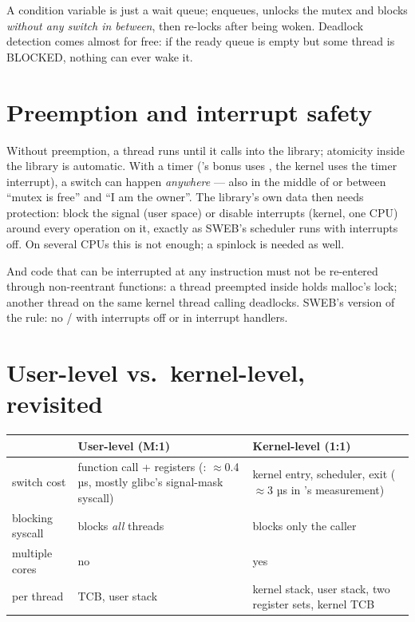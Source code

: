 A condition variable is just a wait queue;  enqueues,
unlocks the mutex and blocks \emph{without any switch in between},
then re-locks after being woken. Deadlock detection comes almost for free:
if the ready queue is empty but some thread is BLOCKED, nothing can ever
wake it.

\section{Preemption and interrupt safety}

Without preemption, a thread runs until it calls into the library;
atomicity inside the library is automatic. With a timer
('s bonus uses , the kernel uses the timer
interrupt), a switch can happen \emph{anywhere} --- also in the middle of
 or between ``mutex is free'' and ``I am the owner''. The
library's own data then needs protection: block the signal (user space)
or disable interrupts (kernel, one CPU) around every operation on it,
exactly as SWEB's scheduler runs with interrupts off. On several CPUs this
is not enough; a spinlock is needed as well.

And code that can be interrupted at any instruction must not be
re-entered through non-reentrant functions: a thread preempted inside
 holds malloc's lock; another thread on the same kernel
thread calling  deadlocks. SWEB's version of the rule: no
/ with interrupts off or in interrupt handlers.

\section{User-level vs.\ kernel-level, revisited}

\begin{center}
\begin{tabular}{L{3.6cm}L{4.8cm}L{4.8cm}}
\toprule
 & \textbf{User-level (M:1)} & \textbf{Kernel-level (1:1)} \\
\midrule
switch cost & function call + registers (: $\approx$0.4 µs,
mostly glibc's signal-mask syscall) & kernel entry, scheduler, exit
($\approx$3 µs in 's measurement) \\
blocking syscall & blocks \emph{all} threads & blocks only the caller \\
multiple cores & no & yes \\
per thread & TCB, user stack & kernel stack, user stack, two register
sets, kernel TCB \\
\bottomrule
\end{tabular}
\end{center}

